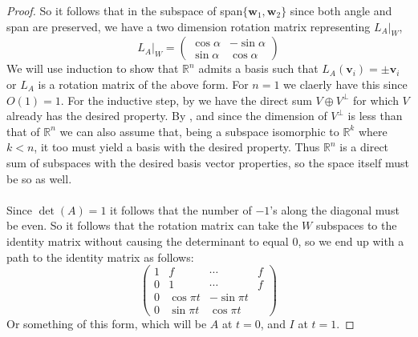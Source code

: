 \documentclass{article}
\theoremstyle{definition}
\begin{document}
\begin{proof}
    So it follows that in the subspace of span$\{\bm w_1, \bm w_2\}$ since both angle and span are preserved,
    we have a two dimension rotation matrix representing $L_A |_W$,
    \[ L_A |_W = \begin{pmatrix}
        \cos \alpha & -\sin \alpha\\
        \sin \alpha & \cos \alpha
    \end{pmatrix}\]
     We will use induction to show that $\mathbb{R}^n$ admits a basis such that $L_A(\bm v_i) = \pm \bm v_i$ or $L_A$
    is a rotation matrix of the above form.
    For $n = 1$ we claerly have this since $O(1) = 1$. For the inductive step, by  we have the direct sum $V \oplus V^\perp$ for which $V$ already has the desired property.
    By , and since the dimension of $V^\perp$ is less than that of $\mathbb{R}^n$ we can also assume that, being a subspace isomorphic to $\mathbb{R}^k$ where $k<n$,
    it too must yield a basis with the desired property. Thus $\mathbb{R}^n$ is a direct sum of subspaces with the desired basis vector properties,
    so the space itself must be so as well.\\\\
     Since $\det(A) = 1$ it follows that the number of $-1$'s along the diagonal must be even. So it follows that 
    the rotation matrix can take the $W$ subspaces to the identity matrix without causing the determinant to equal 0, so we end up with a
    path to the identity matrix as follows:
    \[
        \begin{pmatrix}
            1 & f & \cdots & f\\
            0 & 1 & \cdots & f\\
            0 & \cos \pi t & -\sin \pi t \\
            0 & \sin \pi t & \cos \pi t
        \end{pmatrix}
    \]
    Or something of this form, which will be $A$ at $t = 0$, and $I$ at $t=1$.
\end{proof}
\end{document}
